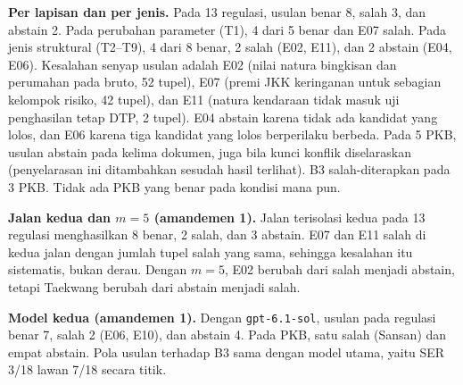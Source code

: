 \documentclass[journal,a4paper]{IEEEtran}
\makeatletter
\DeclareRobustCommand{\en}[1]{{\usefont{\f@encoding}{\f@family}{\f@series}{it}#1\/}}
\makeatother
\begin{document}
\textbf{Per lapisan dan per jenis.} Pada 13 regulasi, usulan benar 8, salah 3, dan \en{abstain} 2. Pada perubahan parameter (T1), 4 dari 5 benar dan E07 salah. Pada jenis struktural (T2--T9), 4 dari 8 benar, 2 salah (E02, E11), dan 2 \en{abstain} (E04, E06). Kesalahan senyap usulan adalah E02 (nilai natura bingkisan dan perumahan pada bruto, 52 tupel), E07 (premi JKK keringanan untuk sebagian kelompok risiko, 42 tupel), dan E11 (natura kendaraan tidak masuk uji penghasilan tetap DTP, 2 tupel). E04 \en{abstain} karena tidak ada kandidat yang lolos, dan E06 karena tiga kandidat yang lolos berperilaku berbeda. Pada 5 PKB, usulan \en{abstain} pada kelima dokumen, juga bila kunci konflik diselaraskan (penyelarasan ini ditambahkan sesudah hasil terlihat). B3 salah-diterapkan pada 3 PKB. Tidak ada PKB yang benar pada kondisi mana pun.

\textbf{Jalan kedua dan $m = 5$ (amandemen 1).} Jalan terisolasi kedua pada 13 regulasi menghasilkan 8 benar, 2 salah, dan 3 \en{abstain}. E07 dan E11 salah di kedua jalan dengan jumlah tupel salah yang sama, sehingga kesalahan itu sistematis, bukan derau. Dengan $m = 5$, E02 berubah dari salah menjadi \en{abstain}, tetapi Taekwang berubah dari \en{abstain} menjadi salah.

\textbf{Model kedua (amandemen 1).} Dengan \texttt{gpt-6.1-sol}, usulan pada regulasi benar 7, salah 2 (E06, E10), dan \en{abstain} 4. Pada PKB, satu salah (Sansan) dan empat \en{abstain}. Pola usulan terhadap B3 sama dengan model utama, yaitu SER 3/18 lawan 7/18 secara titik.
\end{document}
